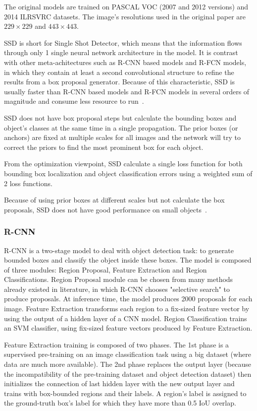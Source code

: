 \documentclass[conference]{IEEEtran}
\begin{document}
The original models are trained on PASCAL VOC (2007 and 2012 versions) and 2014 ILRSVRC datasets. The image's resolutions used in the original paper are $229 \times 229$ and $443 \times 443$.

SSD is short for Single Shot Detector, which means that the information flows through only 1 single neural network architecture in the model. It is contrast with other meta-achitectures such as R-CNN based models and R-FCN models, in which they contain at least a second convolutional structure to refine the results from a box proposal generator. Because of this characteristic, SSD is usually faster than R-CNN based models and R-FCN models in several orders of magnitude and consume less resource to run~\cite{huang2017speed}.

SSD does not have box proposal steps but calculate the bounding boxes and object's classes at the same time in a single propagation. The prior boxes (or anchors) are fixed at multiple scales for all images and the network will try to correct the priors to find the most prominent box for each object.

From the optimization viewpoint, SSD calculate a single loss function for both bounding box localization and object classification errors using a weighted sum of 2 loss functions. 

Because of using prior boxes at different scales but not calculate the box proposals, SSD does not have good performance on small objects~\cite{liu2016ssd}.


\subsubsection{R-CNN }
R-CNN is a two-stage model to deal with object detection task: to generate bounded boxes and classify the object inside these boxes. The model is composed of three modules: Region Proposal, Feature Extraction and Region Classifications. Region Proposal module can be chosen from many methods already existed in literature, in which R-CNN chooses "selective search" to produce proposals. At inference time, the model produces 2000 proposals for each image. Feature Extraction transforms each region to a fix-sized feature vector by using the output of a hidden layer of a CNN model. Region Classification trains an SVM classifier, using fix-sized feature vectors produced by Feature Extraction.

Feature Extraction training is composed of two phases. The 1st phase is a supervised pre-training on an image classification task using a big dataset (where data are much more available). The 2nd phase replaces the output layer (because the incompatibility of the pre-training dataset and object detection dataset) then initializes the connection of last hidden layer with the new output layer and trains with box-bounded regions and their labels. A region's label is assigned to the ground-truth box's label for which they have more than 0.5 IoU overlap.
\end{document}

